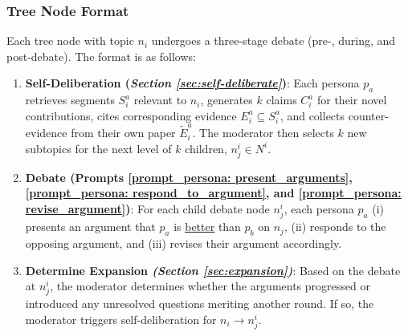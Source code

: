 \subsubsection{\textbf{Tree Node Format}}
\label{sec:debate_round_format}
Each tree node with topic $n_i$ undergoes a three-stage debate (pre-, during, and post-debate). The format is as follows:
\begin{enumerate}[leftmargin=*]
    \item \textbf{Self-Deliberation (\textit{Section \ref{sec:self-deliberate}})}: Each persona $p_a$ retrieves segments $S^a_i$ relevant to $n_i$, generates $k$ claims $C^a_i$ for their novel contributions, cites corresponding evidence $E^a_i \subseteq S^a_i$, and collects counter-evidence from their own paper $\widetilde{E}^a_i$. The moderator then selects $k$ new subtopics for the next level of $k$ children, $n_j^i \in N^i$.
    
    \item \textbf{Debate (Prompts \ref{prompt_persona: present_arguments}, \ref{prompt_persona: respond_to_argument}, and \ref{prompt_persona: revise_argument})}: For each child debate node $n_j^i$, each persona $p_a$ (i) presents an argument that $p_a$ is \underline{better} than $p_b$ on $n_j$, (ii) responds to the opposing argument, and (iii) revises their argument accordingly.
    
    \item \textbf{Determine Expansion \textit{(Section \ref{sec:expansion})}}: Based on the debate at $n_j^i$, the moderator determines whether the arguments progressed or introduced any unresolved questions meriting another round. If so, the moderator triggers self-deliberation for $n_i \rightarrow n^i_j$.
\end{enumerate}

